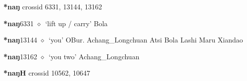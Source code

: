 \item
\textbf{*naŋ}
  {\tiny crossid 6331, 13144, 13162}
  \begin{list}{}{\leftmargin=1.5em \itemindent=-1.5em}
  \item {\footnotesize \textbf{*naŋ}}{\tiny 6331}
         $\diamond$~`lift up / carry'
         Bola 
  \item {\footnotesize \textbf{*naŋ}}{\tiny 13144}
\hspace{1ex}
         $\diamond$~`you'
         OBur. 
\hspace{1ex}
         Achang\_Longchuan 
\hspace{1ex}
         Atsi 
\hspace{1ex}
         Bola 
\hspace{1ex}
         Lashi 
\hspace{1ex}
         Maru 
\hspace{1ex}
         Xiandao 
  \item {\footnotesize \textbf{*naŋ}}{\tiny 13162}
\hspace{1ex}
         $\diamond$~`you two'
         Achang\_Longchuan 
  \end{list}
\item
\textbf{*naŋH}
  {\tiny crossid 10562, 10647}
